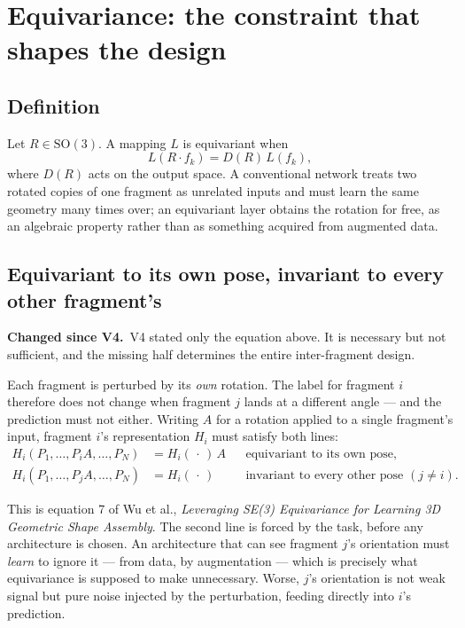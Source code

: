 \documentclass[11pt,a4paper]{report}
\newcommand{\change}[1]{\par\vspace{2pt}\noindent\textcolor{soft}{\small\textbf{Changed since V4.}\ #1}\par\vspace{2pt}}
\newcommand{\SOthree}{\mathrm{SO}(3)}
\begin{document}
\section{Equivariance: the constraint that shapes the design}
\label{sec:equivariance}

\subsection{Definition}
\label{sub:definition}

Let $R \in \SOthree$. A mapping $L$ is equivariant when
\[
L(R \cdot f_k) = D(R)\, L(f_k),
\]
where $D(R)$ acts on the output space. A conventional network treats two rotated
copies of one fragment as unrelated inputs and must learn the same geometry many
times over; an equivariant layer obtains the rotation for free, as an algebraic
property rather than as something acquired from augmented data.

\subsection{Equivariant to its own pose, invariant to every other fragment's}
\label{sub:twolines}

\change{V4 stated only the equation above. It is necessary but not sufficient,
and the missing half determines the entire inter-fragment design.}

Each fragment is perturbed by its \emph{own} rotation. The label for fragment
$i$ therefore does not change when fragment $j$ lands at a different angle --- and
the prediction must not either. Writing $A$ for a rotation applied to a single
fragment's input, fragment $i$'s representation $H_i$ must satisfy both lines:
\[
\begin{aligned}
H_i(P_1,\ldots,P_i A,\ldots,P_N) &= H_i(\,\cdot\,)\, A &&\text{equivariant to its own pose,}\\
H_i(P_1,\ldots,P_j A,\ldots,P_N) &= H_i(\,\cdot\,) &&\text{invariant to every other pose } (j \neq i).
\end{aligned}
\]

This is equation 7 of Wu et al., \emph{Leveraging SE(3) Equivariance for
Learning 3D Geometric Shape Assembly}. The second line is forced by the task,
before any architecture is chosen. An architecture that can see fragment $j$'s
orientation must \emph{learn} to ignore it --- from data, by augmentation ---
which is precisely what equivariance is supposed to make unnecessary. Worse,
$j$'s orientation is not weak signal but pure noise injected by the
perturbation, feeding directly into $i$'s prediction.
\end{document}
